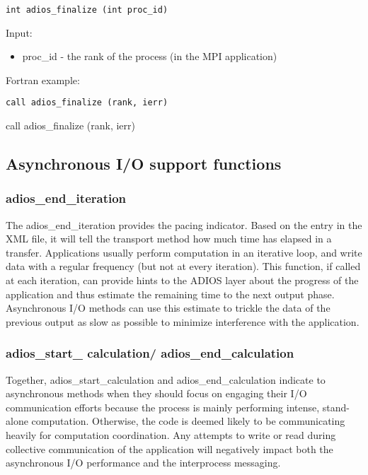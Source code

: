 \begin{lstlisting}[alsolanguage=C,caption={},label={}]
int adios_finalize (int proc_id)
\end{lstlisting}

Input: 
\begin{itemize}
\item proc\_id - the rank of the process (in the MPI application)  
\end{itemize}

Fortran example: 
\begin{lstlisting}[alsolanguage=Fortran,caption={},label={}]
call adios_finalize (rank, ierr)
\end{lstlisting}

call adios\_finalize (rank, ierr)

\subsection{Asynchronous I/O support functions}

\subsubsection{adios\_end\_iteration}

The adios\_end\_iteration provides the pacing indicator. Based on the entry in 
the XML file, it will tell the transport method how much time has elapsed in a 
transfer. Applications usually perform computation in an iterative loop, and write
data with a regular frequency (but not at every iteration). This function, if called
at each iteration, can provide hints to the ADIOS layer about the progress of the 
application and thus estimate the remaining time to the next output phase. Asynchronous
I/O methods can use this estimate to trickle the data of the previous output as slow
as possible to minimize interference with the application. 

\subsubsection{adios\_start\_ calculation/ adios\_end\_calculation}

Together, adios\_start\_calculation and adios\_end\_calculation indicate  
to asynchronous methods when they should focus on engaging their I/O communication 
efforts because the process is mainly performing intense, stand-alone computation. 
Otherwise, the code is deemed likely to be communicating heavily for computation 
coordination. Any attempts to write or read during collective communication of 
the application will negatively 
impact both the asynchronous I/O performance and the interprocess messaging.

